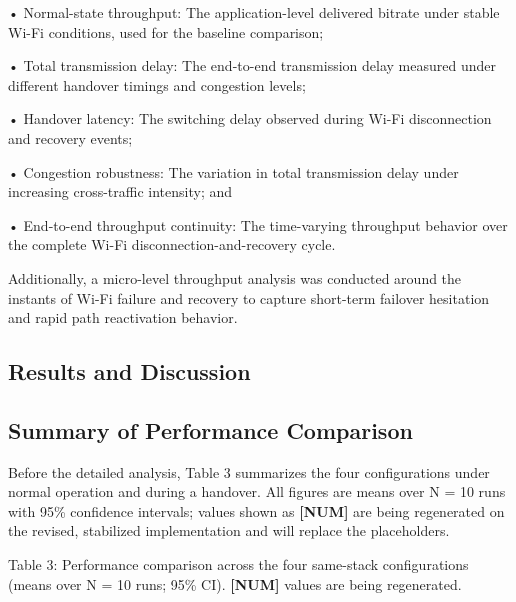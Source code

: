 \documentclass[preprint,11pt]{elsarticle}
\begin{document}
• Normal-state throughput: The application-level delivered bitrate under stable Wi-Fi conditions, used for the baseline comparison;

• Total transmission delay: The end-to-end transmission delay measured under different handover timings and congestion levels;

• Handover latency: The switching delay observed during Wi-Fi disconnection and recovery events;

• Congestion robustness: The variation in total transmission delay under increasing cross-traffic intensity; and

• End-to-end throughput continuity: The time-varying throughput behavior over the complete Wi-Fi disconnection-and-recovery cycle.

Additionally, a micro-level throughput analysis was conducted around the instants of Wi-Fi failure and recovery to capture short-term failover hesitation and rapid path reactivation behavior.
\subsection{Results and Discussion}
\subsection{Summary of Performance Comparison}
Before the detailed analysis, Table 3 summarizes the four configurations under normal operation and during a handover. All figures are means over N = 10 runs with 95\% confidence intervals; values shown as \textbf{[NUM]} are being regenerated on the revised, stabilized implementation and will replace the placeholders.

Table 3: Performance comparison across the four same-stack configurations (means over N = 10 runs; 95\% CI). \textbf{[NUM]} values are being regenerated.
\end{document}

